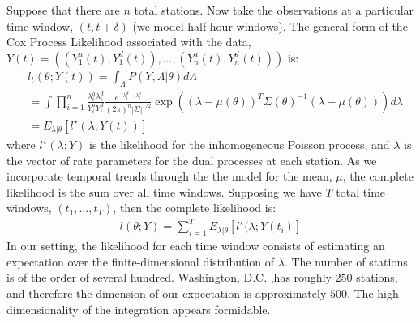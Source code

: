 \documentclass{acm_proc_article-sp}
\begin{document}
Suppose that there are $n$ total stations. Now take the observations at a particular time window, $(t , t+\delta)$ (we model half-hour windows).  The general form of the Cox Process Likelihood associated with the data, \\ $Y(t) = \left( (Y_1^{a} (t), Y_1^{d} (t)), \ldots, (Y_n^{a} (t), Y_n^{d} (t)) \right) $ is:
\begin{align*}
&l_t( \theta; Y(t) ) = \int_{\Lambda} P(Y,  \Lambda | \theta) d \Lambda \\
&= \int\prod_{i=1}^n \frac{\lambda_i^{a} \lambda_i^{d}}{Y_i^{a} Y_i^{d}} \frac{e^{-\lambda_i^{d}-\lambda_i^{a} }}{(2 \pi)^{n} |\Sigma|^{1/2}} \exp \left( (\lambda - \mu (\theta) )^T \Sigma (\theta) ^{-1} (\lambda - \mu (\theta) ) \right) d \lambda \\
&= E_{\lambda | \theta} [l^{\star} ( \lambda; Y(t))]
\end{align*}
\noindent where $l^{\star} ( \lambda; Y)$ is the likelihood for the inhomogeneous Poisson process, and $\lambda$ is the vector of rate parameters for the dual processes at each station.  As we incorporate temporal trends through the the model for the mean, $\mu$, the complete likelihood is the sum over all time windows.  Supposing we have $T$ total time windows, $(t_1, \ldots, t_T)$, then the complete likelihood is:
\begin{align*}
l ( \theta; Y ) = \sum_{i=1}^T  E_{\lambda | \theta} [l^{\star} ( \lambda; Y (t_i)]
\end{align*}
In our setting, the likelihood for each time window consists of estimating an expectation over the finite-dimensional distribution of $\lambda$.  The number of stations is of the order of several hundred.  Washington, D.C. ,has roughly $250$ stations, and therefore the dimension of our expectation is approximately $500$.  The high dimensionality of the integration appears formidable. 
\end{document}
